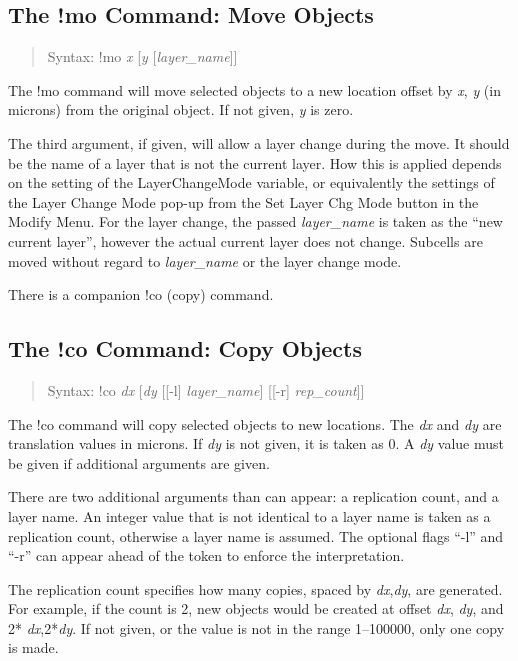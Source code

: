 \subsection{The {\cb !mo} Command: Move Objects}
\begin{quote}
Syntax: {\vt !mo} {\it x} [{\it y} [{\it layer\_name\/}]]
\end{quote}
The {\cb !mo} command will move selected objects to a new location
offset by {\it x}, {\it y} (in microns) from the original object.  If
not given, {\it y} is zero.

The third argument, if given, will allow a layer change during the
move.  It should be the name of a layer that is not the current layer. 
How this is applied depends on the setting of the {\et
LayerChangeMode} variable, or equivalently the settings of the {\cb
Layer Change Mode} pop-up from the {\cb Set Layer Chg Mode} button
in the {\cb Modify Menu}.  For the layer change, the passed {\it
layer\_name} is taken as the ``new current layer'', however the actual
current layer does not change.  Subcells are moved without regard to
{\it layer\_name} or the layer change mode.

There is a companion {\cb !co} (copy) command.

\subsection{The {\cb !co} Command: Copy Objects}
\begin{quote}
Syntax: {\vt !co} {\it dx} [{\it dy} [[-l] {\it layer\_name\/}]
 [[-r] {\it rep\_count\/}]]
\end{quote}
The {\cb !co} command will copy selected objects to new locations. 
The {\it dx} and {\it dy} are translation values in microns.  If {\it
dy} is not given, it is taken as 0.  A {\it dy} value must be given if
additional arguments are given.

There are two additional arguments than can appear:  a replication
count, and a layer name.  An integer value that is not identical to a
layer name is taken as a replication count, otherwise a layer name is
assumed.  The optional flags ``{\vt -l}'' and ``{\vt -r}'' can appear
ahead of the token to enforce the interpretation.

The replication count specifies how many copies, spaced by {\it
dx\/},{\it dy\/}, are generated.  For example, if the count is 2, new
objects would be created at offset {\it dx\/}, {\it dy\/}, and 2*{\it
dx\/},2*{\it dy\/}.  If not given, or the value is not in the range
1--100000, only one copy is made.

